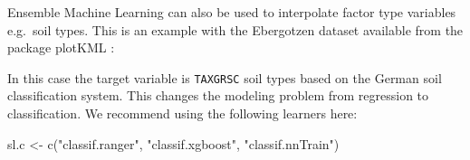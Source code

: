 \documentclass[
  graybox,natbib,nospthms]{svmono}
\newenvironment{Shaded}{\begin{snugshade}}{\end{snugshade}}
\newcommand{\CommentTok}[1]{\textcolor[rgb]{0.37,0.37,0.37}{\textit{#1}}}
\newcommand{\ErrorTok}[1]{\textcolor[rgb]{0.14,0.14,0.14}{\textbf{#1}}}
\newcommand{\FunctionTok}[1]{\textcolor[rgb]{0,0,0}{#1}}
\newcommand{\NormalTok}[1]{#1}
\newcommand{\OtherTok}[1]{\textcolor[rgb]{0.37,0.37,0.37}{#1}}
\newcommand{\SpecialCharTok}[1]{\textcolor[rgb]{0,0,0}{#1}}
\newcommand{\StringTok}[1]{\textcolor[rgb]{0.5,0.5,0.5}{#1}}
\begin{document}
Ensemble Machine Learning can also be used to interpolate factor type variables
e.g.~soil types. This is an example with the Ebergotzen dataset available from
the package plotKML \citep{hengl2015plotkml}:

\begin{Shaded}
\end{Shaded}

In this case the target variable is \texttt{TAXGRSC} soil types based on the German soil
classification system. This changes the modeling problem from regression to
classification. We recommend using the following learners here:

\begin{Shaded}
\begin{Highlighting}[]
\NormalTok{sl.c }\OtherTok{\textless{}{-}} \FunctionTok{c}\NormalTok{(}\StringTok{"classif.ranger"}\NormalTok{, }\StringTok{"classif.xgboost"}\NormalTok{, }\StringTok{"classif.nnTrain"}\NormalTok{)}
\end{Highlighting}
\end{Shaded}
\end{document}
